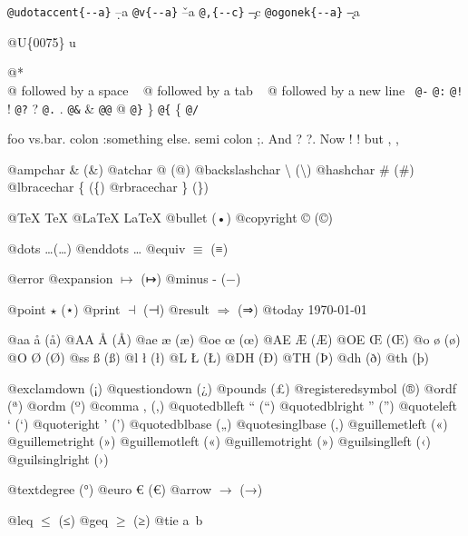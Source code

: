 \documentclass{book}
\renewcommand{\_}{\Texinfounderscore\discretionary{}{}{}}
\begin{document}
\begin{titlepage}
\texttt{@udotaccent\{{-}{-}a\}} \d{--a}
\texttt{@v\{{-}{-}a\}} \v{--a}
\texttt{@,\{{-}{-}c\}} \c{--c}
\texttt{@ogonek\{{-}{-}a\}} \k{--a}

@U\{0075\} u

@* \leavevmode{}\\
@ followed by a space
\ {}
@ followed by a tab
\ {}
@ followed by a new line
\ {}\texttt{@-} \-{}
\texttt{@:} \@
\texttt{@!} \@!
\texttt{@?} \@?
\texttt{@.} \@.
\texttt{@\&} \&
\texttt{@@} @
\texttt{@\}} \}
\texttt{@\{} \{
\texttt{@/} 

foo vs.\@ bar. 
colon :\@And something else.
semi colon ;\@.
And ? ?\@.
Now ! !\@@
but , ,\@

@ampchar \& (\&)
@atchar @ (@)
@backslashchar \textbackslash{} (\textbackslash{})
@hashchar \# (\#)
@lbracechar \{ (\{)
@rbracechar \} (\})

@TeX \TeX{}
@LaTeX \LaTeX{}
@bullet \textbullet{} (•)
@copyright \copyright{} (©)

@dots \dots{}\@ (…)
@enddots \dots{}
@equiv $\equiv{}$ (≡)

@error 
@expansion $\mapsto{}$ (↦)
@minus - (−)

@point $\star{}$ (⋆)
@print $\dashv{}$ (⊣)
@result $\Rightarrow{}$ (⇒)
@today \today{}

@aa \aa{} (å)
@AA \AA{} (Å)
@ae \ae{} (æ)
@oe \oe{} (œ)
@AE \AE{} (Æ)
@OE \OE{} (Œ)
@o \o{} (ø)
@O \O{} (Ø)
@ss \ss{} (ß)
@l \l{} (ł)
@L \L{} (Ł)
@DH \DH{} (Ð)
@TH \TH{} (Þ)
@dh \dh{} (ð)
@th \th{} (þ)

@exclamdown \textexclamdown{} (¡)
@questiondown \textquestiondown{} (¿)
@pounds \textsterling{} (£)
@registeredsymbol \circledR{} (®)
@ordf \textordfeminine{} (ª)
@ordm \textordmasculine{} (º)
@comma , (,)
@quotedblleft \textquotedblleft{} (“)
@quotedblright \textquotedblright{} (”)
@quoteleft \textquoteleft{} (‘)
@quoteright \textquoteright{} (’)
@quotedblbase \quotedblbase{} („)
@quotesinglbase \quotesinglbase{} (‚)
@guillemetleft \guillemotleft{} («)
@guillemetright \guillemotright{} (»)
@guillemotleft \guillemotleft{} («)
@guillemotright \guillemotright{} (»)
@guilsinglleft \guilsinglleft{} (‹)
@guilsinglright \guilsinglright{} (›)

@textdegree \textdegree{} (°)
@euro \euro{} (€)
@arrow $\rightarrow{}$ (→)

@leq $\leq{}$ (≤)
@geq $\geq{}$ (≥)
@tie a~b


\end{titlepage}
\end{document}
